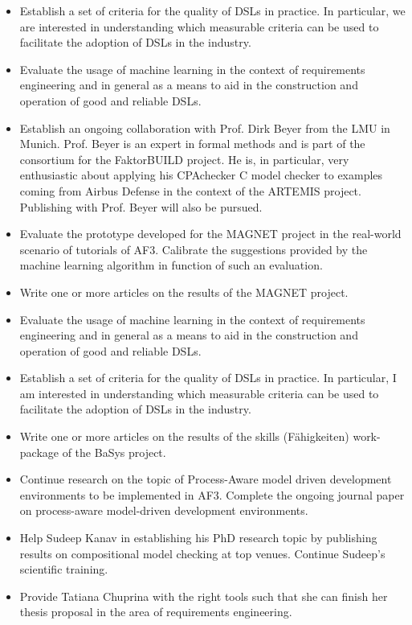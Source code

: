 \documentclass{article}
\begin{document}
\begin{appendices}
\begin{itemize}
  \item Establish a set of criteria for the quality of DSLs in practice. In
  particular, we are interested in understanding which measurable criteria can
  be used to facilitate the adoption of DSLs in the industry.
  \item Evaluate the usage of machine learning in the context of requirements
  engineering and in general as a means to aid in the construction and operation
  of good and reliable DSLs.
  \item Establish an ongoing collaboration with Prof. Dirk Beyer from the LMU in
  Munich. Prof. Beyer is an expert in formal methods and is part of the
  consortium for the FaktorBUILD project. He is, in particular, very
  enthusiastic about applying his CPAchecker C model checker to examples coming
  from Airbus Defense in the context of the ARTEMIS project. Publishing with
  Prof. Beyer will also be pursued.
  \item Evaluate the prototype developed for the MAGNET project in the
  real-world scenario of tutorials of AF3. Calibrate the suggestions provided by
  the machine learning algorithm in function of such an evaluation.
  \item Write one or more articles on the results of the MAGNET project.
  \item Evaluate the usage of machine learning in the context of requirements
  engineering and in general as a means to aid in the construction and operation
  of good and reliable DSLs.
\item Establish a set of criteria for the quality of DSLs in practice. In
particular, I am interested in understanding which measurable criteria can be used to
facilitate the adoption of DSLs in the industry.
  \item Write one or more articles on the results of the skills (F\"ahigkeiten)
  work-package of the BaSys project.
 \item Continue research on the topic of Process-Aware model driven development
environments to be implemented in AF3. Complete the ongoing journal paper on
process-aware model-driven development environments.
 \item Help Sudeep Kanav in establishing his PhD research topic by publishing
 results on compositional model checking at top venues. Continue Sudeep's
 scientific training.
 \item Provide Tatiana Chuprina with the right tools such that she can finish
 her thesis proposal in the area of requirements engineering.
\end{itemize}


\end{appendices}
\end{document}
